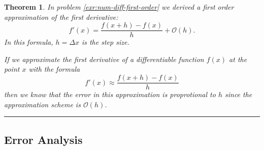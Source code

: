 \documentclass[
]{book}
\newtheorem{theorem}{Theorem}[chapter]
\theoremstyle{definition}
\theoremstyle{definition}
\theoremstyle{definition}
\theoremstyle{remark}
\begin{document}
\begin{theorem}
\protect\hypertarget{thm:first-order-first-deriv}{}{\label{thm:first-order-first-deriv} }In problem \ref{exr:num-diff-first-order} we derived a first order approximation of the first derivative:
\[ f'(x) = \frac{f(x+h) - f(x)}{h} + \mathcal{O}(h).\]
In this formula, \(h = \Delta x\) is the step size.

If we approximate the first derivative of a differentiable function \(f(x)\) at the point \(x\) with the formula
\[ f'(x) \approx \frac{f(x+h)-f(x)}{h} \]
then we know that the error in this approximation is proprotional to \(h\) since the approximation scheme is \(\mathcal{O}(h)\).
\end{theorem}

\begin{center}\rule{0.5\linewidth}{0.5pt}\end{center}

\hypertarget{error-analysis}{%
\subsection{Error Analysis}\label{error-analysis}}
\end{document}
